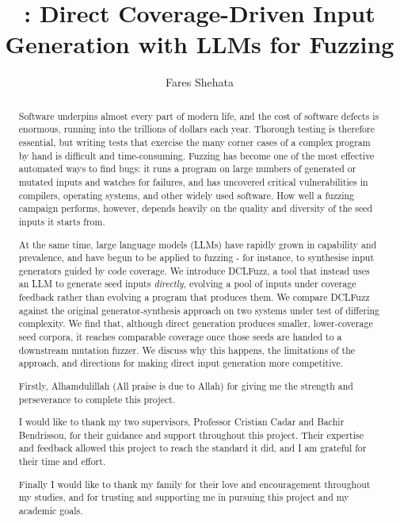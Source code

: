 \documentclass[a4paper, twoside]{report}
\title{\toolname{}: Direct Coverage-Driven Input Generation with LLMs for Fuzzing}
\author{Fares Shehata}
\newcommand{\toolname}{DCLFuzz}
\begin{document}


\begin{abstract}
Software underpins almost every part of modern life, and the cost of software defects is enormous, running into the trillions of dollars each year. Thorough testing is therefore essential, but writing tests that exercise the many corner cases of a complex program by hand is difficult and time-consuming. Fuzzing has become one of the most effective automated ways to find bugs: it runs a program on large numbers of generated or mutated inputs and watches for failures, and has uncovered critical vulnerabilities in compilers, operating systems, and other widely used software. How well a fuzzing campaign performs, however, depends heavily on the quality and diversity of the seed inputs it starts from.

At the same time, large language models (LLMs) have rapidly grown in capability and prevalence, and have begun to be applied to fuzzing - for instance, to synthesise input generators guided by code coverage. We introduce \toolname{}, a tool that instead uses an LLM to generate seed inputs \emph{directly}, evolving a pool of inputs under coverage feedback rather than evolving a program that produces them. We compare \toolname{} against the original generator-synthesis approach on two systems under test of differing complexity. We find that, although direct generation produces smaller, lower-coverage seed corpora, it reaches comparable coverage once those seeds are handed to a downstream mutation fuzzer. We discuss why this happens, the limitations of the approach, and directions for making direct input generation more competitive.
\end{abstract}

\renewcommand{\abstractname}{Acknowledgements}
\begin{abstract}
Firstly, Alhamdulillah (All praise is due to Allah) for giving me the strength and perseverance to complete this project.

I would like to thank my two supervisors, Professor Cristian Cadar and Bachir Bendrissou, for their guidance and support throughout this project. Their expertise and feedback allowed this project to reach the standard it did, and I am grateful for their time and effort.

Finally I would like to thank my family for their love and encouragement throughout my studies, and for trusting and supporting me in pursuing this project and my academic goals.
\end{abstract}

\tableofcontents







% 

\begingroup
\sloppy


\endgroup
\end{document}
